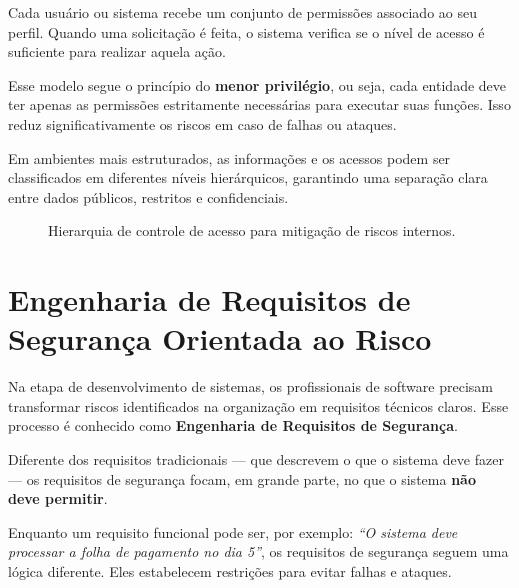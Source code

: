 \documentclass[12pt,a4paper,twoside]{report}
\begin{document}
Cada usuário ou sistema recebe um conjunto de permissões associado ao seu perfil. Quando uma solicitação é feita, o sistema verifica se o nível de acesso é suficiente para realizar aquela ação.

Esse modelo segue o princípio do \textbf{menor privilégio}, ou seja, cada entidade deve ter apenas as permissões estritamente necessárias para executar suas funções. Isso reduz significativamente os riscos em caso de falhas ou ataques.

Em ambientes mais estruturados, as informações e os acessos podem ser classificados em diferentes níveis hierárquicos, garantindo uma separação clara entre dados públicos, restritos e confidenciais.
\begin{figure}[h]
    \centering
    \caption{Hierarquia de controle de acesso para mitigação de riscos internos.} \label{fig:classificacao_mil}
\end{figure}

\section{Engenharia de Requisitos de Segurança Orientada ao Risco}

Na etapa de desenvolvimento de sistemas, os profissionais de software precisam transformar riscos identificados na organização em requisitos técnicos claros. Esse processo é conhecido como \textbf{Engenharia de Requisitos de Segurança}.

Diferente dos requisitos tradicionais — que descrevem o que o sistema deve fazer — os requisitos de segurança focam, em grande parte, no que o sistema \textbf{não deve permitir}.

Enquanto um requisito funcional pode ser, por exemplo: \textit{“O sistema deve processar a folha de pagamento no dia 5”}, os requisitos de segurança seguem uma lógica diferente. Eles estabelecem restrições para evitar falhas e ataques.
\end{document}
